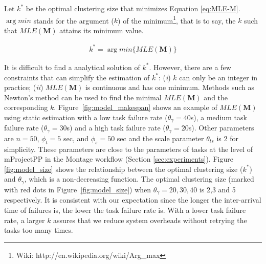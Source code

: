 \documentclass{IOS-Book-Article}
\begin{document}


Let $k^*$ be the optimal clustering size that minimizes Equation \ref{eq:MLE-M}.  $\arg min$  stands for the argument ($k$) of the minimum\footnote{Wiki: http://en.wikipedia.org/wiki/Arg\_max}, that is to say, the $k$ such that $MLE(\bm{M})$ attains its minimum value. 

\begin{eqnarray} 
\label{eq:k_optimal}
k^*=\arg min\{MLE(\bm{M})\} 
\end{eqnarray}

It is difficult to find a analytical solution of $k^*$. However, there are a few constraints that can simplify the estimation of $k^*$: (\emph{i}) $k$ can only be an integer in practice; (\emph{ii}) $MLE(\bm{M})$ is continuous and has one minimum. Methods such as Newton's method can be used to find the minimal $MLE(\bm{M})$ and the corresponding $k$. Figure~\ref{fig:model_makespan} shows an example of $MLE(\bm{M})$ using static estimation with a low task failure rate ($\theta_{\gamma}=40$s), a medium task failure rate ($\theta_{\gamma}=30$s) and a high task failure rate ($\theta_{\gamma}=20$s). Other parameters are $n=50$, $\phi_{t}=5$ sec, and $\phi_{s}=50$ sec and the scale parameter $\theta_{ts}$ is 2 for simplicity. These parameters are close to the parameters of tasks at the level of mProjectPP in the Montage workflow (Section \ref{sec:experiments}). 
Figure \ref{fig:model_size} shows the relationship between the optimal clustering size ($k^*$) and $\theta_{\gamma}$, which is a non-decreasing function. The optimal clustering size (marked with red dots in Figure~\ref{fig:model_size}) when $\theta_{\gamma}=20,30,40$ is 2,3 and 5 respectively. 
 It is consistent with our expectation since the longer the inter-arrival time of failures is, the lower the task failure rate is. With a lower task failure rate, a larger $k$ assures that we reduce system overheads without retrying the tasks too many times.  
\end{document}
